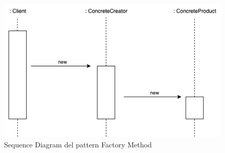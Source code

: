 \begin{figure}[H]
    \centering
    \includegraphics[width=0.8\linewidth]{assets/pattern/factory-method/factory-method-sequence.drawio.png}
    \caption{Sequence Diagram del pattern Factory Method}
\end{figure}

\newpage
